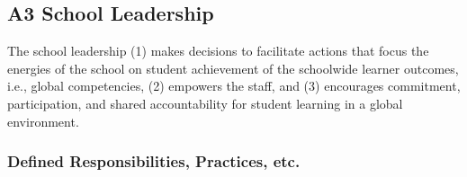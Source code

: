 \subsection{A3 School Leadership}
The school leadership (1) makes decisions to facilitate actions that focus the energies of the school on student achievement of the schoolwide learner outcomes, i.e., global competencies, (2) empowers the staff, and (3) encourages commitment, participation, and shared accountability for student learning in a global environment.

\subsubsection{Defined Responsibilities, Practices, etc.}




